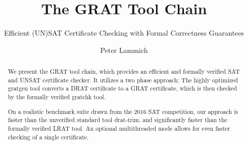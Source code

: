\documentclass{llncs}
\begin{document}
\title{The GRAT Tool Chain}
\subtitle{Efficient (UN)SAT Certificate Checking with Formal Correctness Guarantees}

\author{Peter Lammich}


\maketitle

\begin{abstract}
We present the GRAT tool chain, which provides an efficient and formally verified SAT and UNSAT certificate checker.
It utilizes a two phase approach: The highly optimized gratgen tool converts a DRAT certificate to a GRAT certificate, which is then
checked by the formally verified gratchk tool. 

On a realistic benchmark suite drawn from the 2016 SAT competition,
our approach is faster than the unverified standard tool drat-trim, and significantly faster than the formally verified LRAT tool.
An optional multithreaded mode allows for even faster checking of a single certificate.
\end{abstract}

% 
% 
\end{document}

